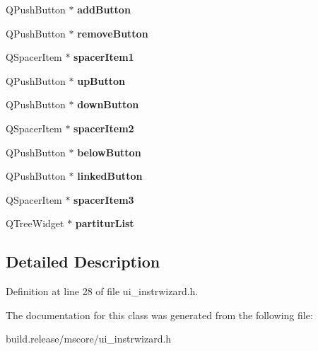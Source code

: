 \begin{DoxyCompactItemize}
Q\+Push\+Button $\ast$ {\bfseries add\+Button}
\item 
\mbox{\label{class_ui___instrument_wizard_af728b0885cca2a26bb6c448fc5649c60}} 
Q\+Push\+Button $\ast$ {\bfseries remove\+Button}
\item 
\mbox{\label{class_ui___instrument_wizard_ae4b318d69aada92a06543a631135d874}} 
Q\+Spacer\+Item $\ast$ {\bfseries spacer\+Item1}
\item 
\mbox{\label{class_ui___instrument_wizard_a330a40a1109d4407f3adf58165b1b3ef}} 
Q\+Push\+Button $\ast$ {\bfseries up\+Button}
\item 
\mbox{\label{class_ui___instrument_wizard_a4d51c233fcd222079998bbdf32cfa94b}} 
Q\+Push\+Button $\ast$ {\bfseries down\+Button}
\item 
\mbox{\label{class_ui___instrument_wizard_a61429f4fd8d87bdab2c10a1b8c406c21}} 
Q\+Spacer\+Item $\ast$ {\bfseries spacer\+Item2}
\item 
\mbox{\label{class_ui___instrument_wizard_a69b7978eb3ac97af321a8d3dcaeb24e3}} 
Q\+Push\+Button $\ast$ {\bfseries below\+Button}
\item 
\mbox{\label{class_ui___instrument_wizard_a3cf6386af2d89000dcdda21c2118872e}} 
Q\+Push\+Button $\ast$ {\bfseries linked\+Button}
\item 
\mbox{\label{class_ui___instrument_wizard_a979ac93dd334cb7cf3362ca40096aa28}} 
Q\+Spacer\+Item $\ast$ {\bfseries spacer\+Item3}
\item 
\mbox{\label{class_ui___instrument_wizard_a3aa55f25e0863c730d3886c8df53265a}} 
Q\+Tree\+Widget $\ast$ {\bfseries partitur\+List}
\end{DoxyCompactItemize}


\subsection{Detailed Description}


Definition at line 28 of file ui\+\_\+instrwizard.\+h.



The documentation for this class was generated from the following file\+:\begin{DoxyCompactItemize}
\item 
build.\+release/mscore/ui\+\_\+instrwizard.\+h\end{DoxyCompactItemize}
